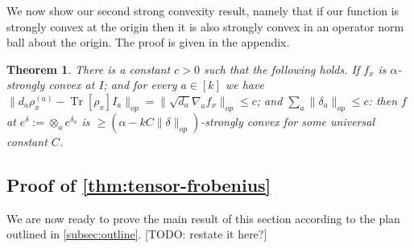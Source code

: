 \documentclass{article}
\newtheorem{theorem}{Theorem}
\newcommand\samp{x}
\newcommand\tr{\operatorname{Tr}}
\newcommand{\CF}[1]{{\color{purple}[CF: #1]}}
\newcommand{\TODO}[1]{{\color{blue}[TODO: #1]}}
\begin{document}



We now show our second strong convexity result, namely that if our function is strongly convex at the origin then it is also strongly convex in an operator norm ball about the origin. The proof is given in the appendix. 


\begin{theorem} \label{convexRobustness}
There is a constant $c>0$ such that the following holds. If $f_{\samp}$ is $\alpha$-strongly convex at $I$; and for every $a \in [k]$ we have $\|d_{a} \rho_{\samp}^{(a)} - \tr[\rho_{\samp}] I_{a}\|_{op} = \|\sqrt{d_{a}} \nabla_{a} f_{\samp}\|_{op} \leq c$; and $\sum_{a} \|\delta_{a}\|_{op} \leq c$: then $f$ at $e^{\delta} := \otimes_{a} e^{\delta_{a}}$ is $\geq (\alpha - k C \|\delta\|_{op})$-strongly convex for some universal constant $C$. 
\end{theorem}

\subsection{Proof of \cref{thm:tensor-frobenius}}
We are now ready to prove the main result of this section according to the plan outlined in \cref{subsec:outline}.
\TODO{restate it here?}
\end{document}

